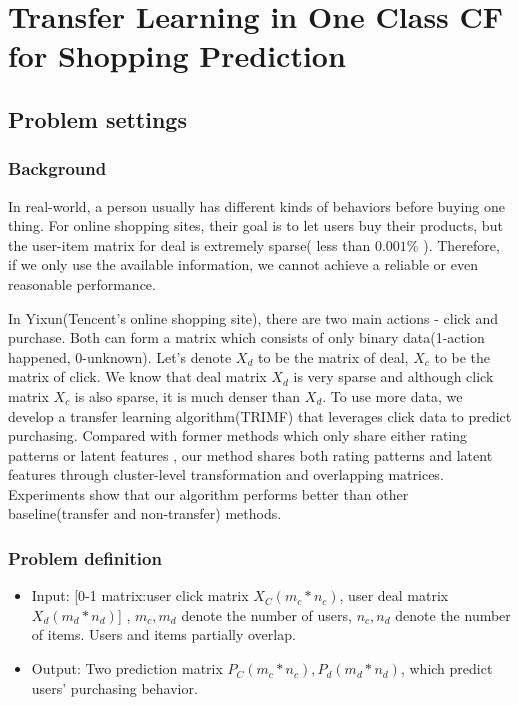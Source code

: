 \chapter{Transfer Learning in One Class CF for Shopping Prediction}
\label{chp:trimf}
\section{Problem settings}
\subsection{Background}
\par{
In real-world, a person usually has different kinds of behaviors before buying one thing. For online shopping sites, their goal is to let users buy their products, but the user-item matrix for deal is extremely sparse( less than $0.001\%$ ). Therefore, if we only use the available information, we cannot achieve a reliable or even reasonable performance.

In Yixun(Tencent's online shopping site), there are two main actions - click and purchase. Both can form a matrix which consists of only binary data(1-action happened, 0-unknown). Let's denote $X_d$ to be the matrix of deal, $X_c$ to be the matrix of click. We know that deal matrix $X_d$ is very sparse and although click matrix $X_c$ is also sparse, it is much denser than $X_d$. To use more data, we develop a transfer learning algorithm(TRIMF) that leverages click data to predict purchasing. Compared with former methods which only share either rating patterns or latent features , our method shares both rating patterns and latent features through cluster-level transformation and overlapping matrices. Experiments show that our algorithm performs better than other baseline(transfer and non-transfer) methods.}

\subsection{Problem definition}
  \begin{itemize}
  \item Input: [0-1 matrix:user click matrix $X_C(m_c*n_c)$, user deal matrix $X_d(m_d*n_d)$] , $m_c, m_d$ denote the number of users, $n_c, n_d$ denote the number of items. Users and items partially overlap.
  \item Output: Two prediction matrix $P_C(m_c*n_c), P_d(m_d*n_d)$, which predict users' purchasing behavior.
  \end{itemize}



